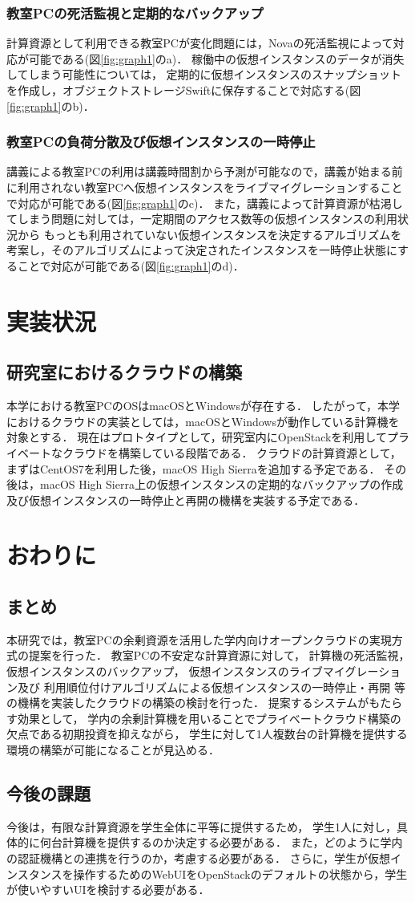 \documentclass[10pt,a4paper]{jsarticle}
\begin{document}
\subsubsection{教室PCの死活監視と定期的なバックアップ}
計算資源として利用できる教室PCが変化問題には，Novaの死活監視によって対応が可能である(図\ref{fig:graph1}のa)．
稼働中の仮想インスタンスのデータが消失してしまう可能性については，
定期的に仮想インスタンスのスナップショットを作成し，オブジェクトストレージSwiftに保存することで対応する(図\ref{fig:graph1}のb)．
\subsubsection{教室PCの負荷分散及び仮想インスタンスの一時停止}
講義による教室PCの利用は講義時間割から予測が可能なので，講義が始まる前に利用されない教室PCへ仮想インスタンスをライブマイグレーションすることで対応が可能である(図\ref{fig:graph1}のc)．
また，講義によって計算資源が枯渇してしまう問題に対しては，一定期間のアクセス数等の仮想インスタンスの利用状況から
もっとも利用されていない仮想インスタンスを決定するアルゴリズムを考案し，そのアルゴリズムによって決定されたインスタンスを一時停止状態にすることで対応が可能である(図\ref{fig:graph1}のd)．

\section{実装状況}
\subsection{研究室におけるクラウドの構築}
本学における教室PCのOSはmacOSとWindowsが存在する．
したがって，本学におけるクラウドの実装としては，macOSとWindowsが動作している計算機を対象とする．
現在はプロトタイプとして，研究室内にOpenStackを利用してプライベートなクラウドを構築している段階である．
クラウドの計算資源として，まずはCentOS7を利用した後，macOS High Sierraを追加する予定である．
その後は，macOS High Sierra上の仮想インスタンスの定期的なバックアップの作成
及び仮想インスタンスの一時停止と再開の機構を実装する予定である．

\section{おわりに}
\subsection{まとめ}
本研究では，教室PCの余剰資源を活用した学内向けオープンクラウドの実現方式の提案を行った．
教室PCの不安定な計算資源に対して，
計算機の死活監視，仮想インスタンスのバックアップ，
仮想インスタンスのライブマイグレーション及び
利用順位付けアルゴリズムによる仮想インスタンスの一時停止・再開
等の機構を実装したクラウドの構築の検討を行った．
提案するシステムがもたらす効果として，
学内の余剰計算機を用いることでプライベートクラウド構築の欠点である初期投資を抑えながら，
学生に対して1人複数台の計算機を提供する環境の構築が可能になることが見込める．
\subsection{今後の課題}
今後は，有限な計算資源を学生全体に平等に提供するため，
学生1人に対し，具体的に何台計算機を提供するのか決定する必要がある．
また，どのように学内の認証機構との連携を行うのか，考慮する必要がある．
さらに，学生が仮想インスタンスを操作するためのWebUIをOpenStackのデフォルトの状態から，学生が使いやすいUIを検討する必要がある．


\end{document}
